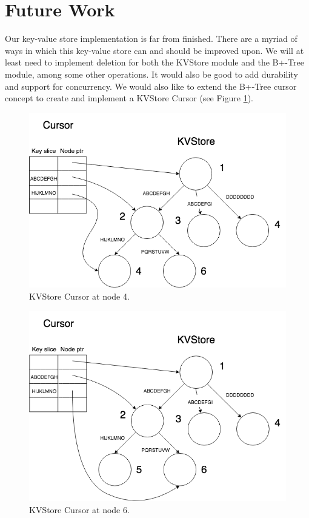 \section{Future Work}

Our key-value store implementation is far from finished. There are a myriad of ways in which this key-value store can and should be improved upon. We will at least need to implement deletion for both the KVStore module and the B+-Tree module, among some other operations. It would also be good to add durability and support for concurrency. We would also like to extend the B+-Tree cursor concept to create and implement a KVStore Cursor (see Figure \ref{fig:KVStoreCursor1}). 

\begin{figure}[h]
    \centering
    \includegraphics[scale=0.50]{figures/kvcursor1.png}
    \caption{KVStore Cursor at node 4.}
    \label{fig:KVStoreCursor1}
\end{figure}

\begin{figure}[h]
    \centering
    \includegraphics[scale=0.50]{figures/kvcursor2.png}
    \caption{KVStore Cursor at node 6.}
    \label{fig:KVStoreCursor2}
\end{figure}

